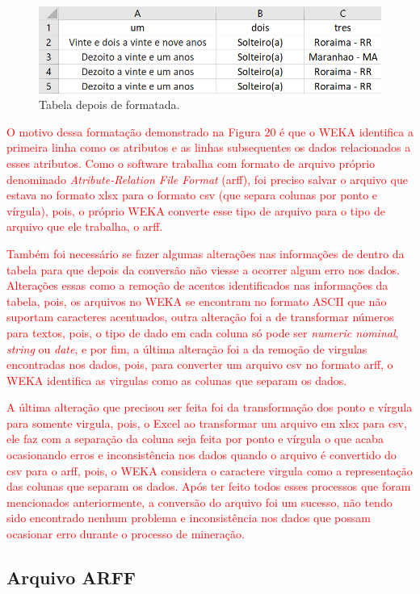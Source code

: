 \par
\begin{figure}[!htp]
	\begin{center}
    \caption{\label{fig:waveform_fig} Tabela depois de formatada.}
	\includegraphics[scale=0.65]{Figuras/Formato_certo.png}
	\end{center}
\end{figure}

\par
\textcolor{red}{O motivo dessa formatação demonstrado na Figura 20 é que o WEKA identifica a primeira linha como os atributos e as linhas subsequentes os dados relacionados a esses atributos. Como o software trabalha com formato de arquivo próprio denominado \textit{Atribute-Relation File Format} (arff), foi preciso salvar o arquivo que estava no formato xlsx para o formato csv (que separa colunas por ponto e vírgula), pois, o próprio WEKA converte esse tipo de arquivo para o tipo de arquivo que ele trabalha, o arff.}

\par
\textcolor{red}{Também foi necessário se fazer algumas alterações nas informações de dentro da tabela para que depois da conversão não viesse a ocorrer algum erro nos dados. Alterações essas como a remoção de acentos identificados nas informações da tabela, pois, os arquivos no WEKA se encontram no formato ASCII que não suportam caracteres acentuados, outra alteração foi a de transformar números para textos, pois, o tipo de dado em cada coluna só pode ser \textit{numeric nominal}, \textit{string} ou \textit{date}, e por fim, a última alteração foi a da remoção de virgulas encontradas nos dados, pois, para converter um arquivo csv no formato arff, o WEKA identifica as virgulas como as colunas que separam os dados.}

\par
\textcolor{red}{A última alteração que precisou ser feita foi da transformação dos ponto e vírgula para somente virgula, pois, o Excel ao transformar um arquivo em xlsx para csv, ele faz com a separação da coluna seja feita por ponto e vírgula o que acaba ocasionando erros e inconsistência nos dados quando o arquivo é convertido do csv para o arff, pois, o WEKA considera o caractere virgula como a representação das colunas que separam os dados. Após ter feito todos esses processos que foram mencionados anteriormente, a conversão do arquivo foi um sucesso, não tendo sido encontrado nenhum problema e inconsistência nos dados que possam ocasionar erro durante o processo de mineração.}


\subsection{Arquivo ARFF}

\par
\textcolor{}{}
